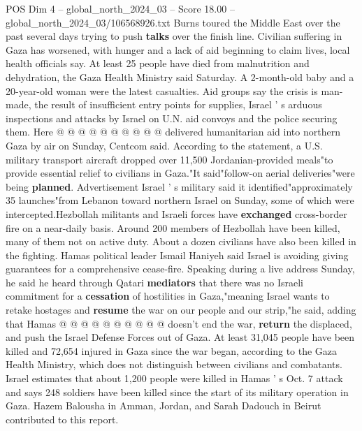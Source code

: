 \begin{textsample}{POS Dim 4 – global\_north\_2024\_03 – Score 18.00 – global\_north\_2024\_03/106568926.txt}
Burns toured the Middle East over the past several days trying to push \textbf{talks} over the finish line.
Civilian suffering in Gaza has worsened, with hunger and a lack of aid beginning to claim lives, local health officials say.
At least 25 people have died from malnutrition and dehydration, the Gaza Health Ministry said Saturday.
A 2-month-old baby and a 20-year-old woman were the latest casualties.
Aid groups say the crisis is man-made, the result of insufficient entry points for supplies, Israel ' s arduous inspections and attacks by Israel on U.N. aid convoys and the police securing them.
Here @ @ @ @ @ @ @ @ @ @ delivered humanitarian aid into northern Gaza by air on Sunday, Centcom said.
According to the statement, a U.S. military transport aircraft dropped over 11,500 Jordanian-provided meals"to provide essential relief to civilians in Gaza."It said"follow-on aerial deliveries"were being \textbf{planned}.
Advertisement Israel ' s military said it identified"approximately 35 launches"from Lebanon toward northern Israel on Sunday, some of which were intercepted.Hezbollah militants and Israeli forces have \textbf{exchanged} cross-border fire on a near-daily basis.
Around 200 members of Hezbollah have been killed, many of them not on active duty.
About a dozen civilians have also been killed in the fighting.
Hamas political leader Ismail Haniyeh said Israel is avoiding giving guarantees for a comprehensive cease-fire.
Speaking during a live address Sunday, he said he heard through Qatari \textbf{mediators} that there was no Israeli commitment for a \textbf{cessation} of hostilities in Gaza,"meaning Israel wants to retake hostages and \textbf{resume} the war on our people and our strip,"he said, adding that Hamas @ @ @ @ @ @ @ @ @ @ doesn't end the war, \textbf{return} the displaced, and push the Israel Defense Forces out of Gaza.
At least 31,045 people have been killed and 72,654 injured in Gaza since the war began, according to the Gaza Health Ministry, which does not distinguish between civilians and combatants.
Israel estimates that about 1,200 people were killed in Hamas ' s Oct. 7 attack and says 248 soldiers have been killed since the start of its military operation in Gaza.
Hazem Balousha in Amman, Jordan, and Sarah Dadouch in Beirut contributed to this report.

\end{textsample}
